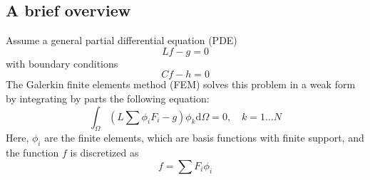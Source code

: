\subsection{A brief overview}

Assume a general partial differential equation (PDE)
\begin{equation}
Lf - g = 0
\end{equation}
with boundary conditions
\begin{equation}
Cf - h = 0
\end{equation}
The Galerkin finite elements method (FEM) solves this problem
in a weak form by integrating by parts the following equation:
\begin{equation}
\int_\Omega  {\left( {L\sum {{\phi _i}{F_i} - g} } \right){\phi _k}{\text{d}}\Omega }  = 0,\quad k = 1 \ldots N
\end{equation}
Here, $\phi_i$ are the finite elements, which are basis functions with
finite support, and the function $f$ is discretized as
\begin{equation}
f = \sum {{F_i}{\phi _i}} 
\end{equation}

